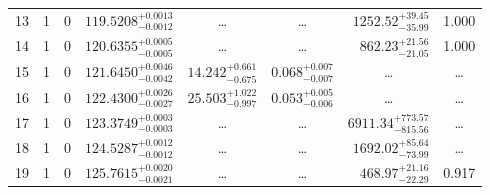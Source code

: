 \begin{table*}[!]
\begin{tabular}{llcrrlrc}
13 & 1 & 0 & $    119.5208_{-      0.0012}^{+      0.0013}$ & \multicolumn{1}{c}{\dots} & \multicolumn{1}{c}{\dots} & $     1252.52_{-       35.99}^{+       39.45}$ & 1.000\\[1pt]
14 & 1 & 0 & $    120.6355_{-      0.0005}^{+      0.0005}$ & \multicolumn{1}{c}{\dots} & \multicolumn{1}{c}{\dots} & $      862.23_{-       21.05}^{+       21.56}$ & 1.000\\[1pt]
15 & 1 & 0 & $    121.6450_{-      0.0042}^{+      0.0046}$ & $      14.242_{-       0.675}^{+       0.661}$ & $       0.068_{-       0.007}^{+       0.007}$ & \multicolumn{1}{c}{\dots} & \dots \\[1pt]
16 & 1 & 0 & $    122.4300_{-      0.0027}^{+      0.0026}$ & $      25.503_{-       0.997}^{+       1.022}$ & $       0.053_{-       0.006}^{+       0.005}$ & \multicolumn{1}{c}{\dots} & \dots \\[1pt]
17 & 1 & 0 & $    123.3749_{-      0.0003}^{+      0.0003}$ & \multicolumn{1}{c}{\dots} & \multicolumn{1}{c}{\dots} & $     6911.34_{-      815.56}^{+      773.57}$ & \dots \\[1pt]
18 & 1 & 0 & $    124.5287_{-      0.0012}^{+      0.0012}$ & \multicolumn{1}{c}{\dots} & \multicolumn{1}{c}{\dots} & $     1692.02_{-       73.99}^{+       85.64}$ & \dots \\[1pt]
19 & 1 & 0 & $    125.7615_{-      0.0021}^{+      0.0020}$ & \multicolumn{1}{c}{\dots} & \multicolumn{1}{c}{\dots} & $      468.97_{-       22.29}^{+       21.16}$ & 0.917\\[1pt]


\end{tabular}
\end{table*}
